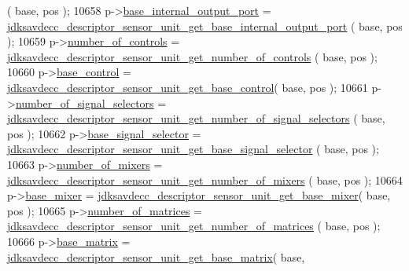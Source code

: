 \begin{DoxyCode}
      ( base, pos );
10658         p->\hyperlink{structjdksavdecc__descriptor__sensor__unit_a238f1b0f1c8556b5e9586d93541169a5}{base\_internal\_output\_port} = 
      \hyperlink{group__descriptor__sensor_ga9472660337e9837c736087c68d1b817d}{jdksavdecc\_descriptor\_sensor\_unit\_get\_base\_internal\_output\_port}
      ( base, pos );
10659         p->\hyperlink{structjdksavdecc__descriptor__sensor__unit_a0104bea638bdadf1a547c2b93813e22f}{number\_of\_controls} = 
      \hyperlink{group__descriptor__sensor_ga0f1c675a85a83a3ff5eed7103f8067ff}{jdksavdecc\_descriptor\_sensor\_unit\_get\_number\_of\_controls}
      ( base, pos );
10660         p->\hyperlink{structjdksavdecc__descriptor__sensor__unit_af06eac7dd98377a85258308e8a25e7f2}{base\_control} = 
      \hyperlink{group__descriptor__sensor_gae6f8a9ca5baa42adfcde9de0d63228a1}{jdksavdecc\_descriptor\_sensor\_unit\_get\_base\_control}( base,
       pos );
10661         p->\hyperlink{structjdksavdecc__descriptor__sensor__unit_af062758f302e01b8b7b7bd84cdb15806}{number\_of\_signal\_selectors} = 
      \hyperlink{group__descriptor__sensor_gac556159c7ca6b95e4d39eb26f2bcc2e1}{jdksavdecc\_descriptor\_sensor\_unit\_get\_number\_of\_signal\_selectors}
      ( base, pos );
10662         p->\hyperlink{structjdksavdecc__descriptor__sensor__unit_a5bd998af8a76ae1336006ec16829b64d}{base\_signal\_selector} = 
      \hyperlink{group__descriptor__sensor_ga6cceb73a85c154792b0a8d78aa4eb66e}{jdksavdecc\_descriptor\_sensor\_unit\_get\_base\_signal\_selector}
      ( base, pos );
10663         p->\hyperlink{structjdksavdecc__descriptor__sensor__unit_a6d06803f27b9635d1fb276aa4d4a070b}{number\_of\_mixers} = 
      \hyperlink{group__descriptor__sensor_ga58b4b394661e78d2ac5597c8d438c6b1}{jdksavdecc\_descriptor\_sensor\_unit\_get\_number\_of\_mixers}
      ( base, pos );
10664         p->\hyperlink{structjdksavdecc__descriptor__sensor__unit_ad2cbeba461f7e25ffee9118ab1343ee0}{base\_mixer} = 
      \hyperlink{group__descriptor__sensor_ga6b4b55c548efa8d788053be0ee556ae2}{jdksavdecc\_descriptor\_sensor\_unit\_get\_base\_mixer}( base, pos
       );
10665         p->\hyperlink{structjdksavdecc__descriptor__sensor__unit_a0c19f1b0409a0cdaaf557f4a7a717260}{number\_of\_matrices} = 
      \hyperlink{group__descriptor__sensor_ga60e0b0d8c251cc463954dac6a84dfe90}{jdksavdecc\_descriptor\_sensor\_unit\_get\_number\_of\_matrices}
      ( base, pos );
10666         p->\hyperlink{structjdksavdecc__descriptor__sensor__unit_a4faf17fd3b3d91f6b24fe8d66a042309}{base\_matrix} = 
      \hyperlink{group__descriptor__sensor_ga19c9d0f9b8e5580d232cb817f1bb830f}{jdksavdecc\_descriptor\_sensor\_unit\_get\_base\_matrix}( base, 

\end{DoxyCode}
